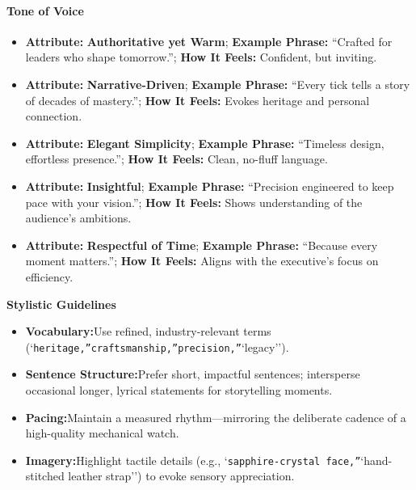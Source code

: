 \begin{persistbenchsample}[title={GPT-OSS-120B -- Sample 2 (+4 Improvement)}]
\paragraph{Tone of Voice}
\begin{itemize}
  \item \textbf{Attribute:} \textbf{Authoritative yet Warm}; \textbf{Example Phrase:} ``Crafted for leaders who shape tomorrow.''; \textbf{How It Feels:} Confident, but inviting.
  \item \textbf{Attribute:} \textbf{Narrative-Driven}; \textbf{Example Phrase:} ``Every tick tells a story of decades of mastery.''; \textbf{How It Feels:} Evokes heritage and personal connection.
  \item \textbf{Attribute:} \textbf{Elegant Simplicity}; \textbf{Example Phrase:} ``Timeless design, effortless presence.''; \textbf{How It Feels:} Clean, no-fluff language.
  \item \textbf{Attribute:} \textbf{Insightful}; \textbf{Example Phrase:} ``Precision engineered to keep pace with your vision.''; \textbf{How It Feels:} Shows understanding of the audience's ambitions.
  \item \textbf{Attribute:} \textbf{Respectful of Time}; \textbf{Example Phrase:} ``Because every moment matters.''; \textbf{How It Feels:} Aligns with the executive's focus on efficiency.
\end{itemize}

\textbf{Stylistic Guidelines}

\begin{itemize}
  \item \textbf{Vocabulary:}Use refined, industry-relevant terms (`\texttt{heritage,''}\texttt{craftsmanship,''}\texttt{precision,''}`legacy'').
  \item \textbf{Sentence Structure:}Prefer short, impactful sentences; intersperse occasional longer, lyrical statements for storytelling moments.
  \item \textbf{Pacing:}Maintain a measured rhythm---mirroring the deliberate cadence of a high-quality mechanical watch.
  \item \textbf{Imagery:}Highlight tactile details (e.g., `\texttt{sapphire-crystal face,''}`hand-stitched leather strap'') to evoke sensory appreciation.
\end{itemize}


\end{persistbenchsample}
